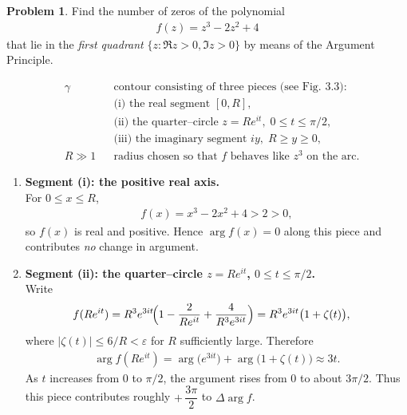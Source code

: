 \documentclass[12pt]{article}
\theoremstyle{definition} %
\newtheorem{problem}{Problem}
\theoremstyle{plain} %
\begin{document}
\begin{problem}
    Find the number of zeros of the polynomial
    \begin{align}
        f(z)=z^{3}-2z^{2}+4
    \end{align}
    that lie in the \emph{first quadrant} $\{z:\Re z>0,\Im z>0\}$ by means of the Argument Principle.
    
    \begin{align}
        &\gamma   &&\text{contour consisting of three pieces (see Fig.~3.3):}\\
        &         &&\text{(i) the real segment }[0,R],\\
        &         &&\text{(ii) the quarter--circle }z=Re^{it},\;0\le t\le\pi/2,\\
        &         &&\text{(iii) the imaginary segment }iy,\;R\ge y\ge0,\\
        &R\gg1    &&\text{radius chosen so that $f$ behaves like $z^{3}$ on the arc.}
    \end{align}
    
    \begin{enumerate}
        \item\textbf{Segment (i): the positive real axis.}\\
              For $0\le x\le R$,
              \begin{align}
                  f(x)=x^{3}-2x^{2}+4>2>0,
              \end{align}
              so $f(x)$ is real and positive.  
              Hence $\arg f(x)=0$ along this piece and contributes \emph{no} change in argument.
        
        \item\textbf{Segment (ii): the quarter–circle $z=Re^{it}$, $0\le t\le\pi/2$.}\\
              Write
              \begin{align}
                  f(Re^{it})&=R^{3}e^{3it}\!\Bigl(1-\frac{2}{Re^{it}}+\frac{4}{R^{3}e^{3it}}\Bigr)
                             =R^{3}e^{3it}\bigl(1+\zeta(t)\bigr),
              \end{align}
              where $|\zeta(t)|\le6/R<\varepsilon$ for $R$ sufficiently large.  
              Therefore
              \begin{align}
                  \arg f(Re^{it})=\arg\bigl(e^{3it}\bigr)+\arg\bigl(1+\zeta(t)\bigr)\approx 3t.
              \end{align}
              As $t$ increases from $0$ to $\pi/2$, the argument rises from $0$ to about $3\pi/2$.  
              Thus this piece contributes roughly $+\,\dfrac{3\pi}{2}$ to $\Delta\arg f$.
        

\end{enumerate}
\end{problem}
\end{document}
